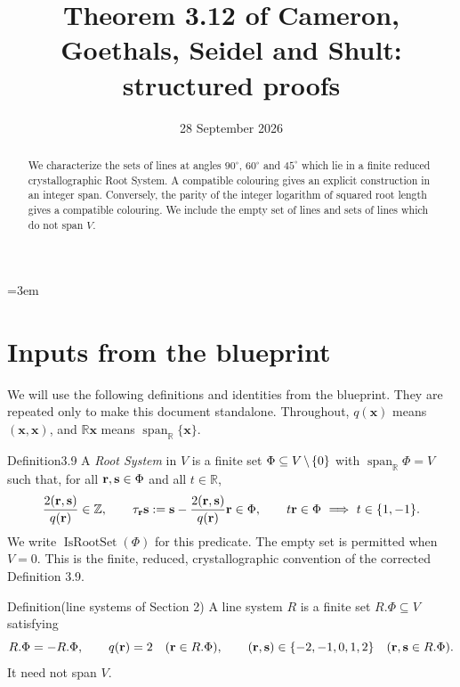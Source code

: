 \documentclass[11pt]{amsart}
\newcommand\ints{{\mathbb Z}}
\newcommand\re{{\mathbb R}}%
\newcommand\Zx{{\mathbf x}}
\newcommand\opk[1]{\mathop{\mathrm{#1}}\nolimits}
\newcommand\diff{\mathbin{\mkern-1.5mu\setminus\mkern-1.5mu}}%
\newcommand\sbs{\subseteq}
\begin{document}
\title[Theorem 3.12: structured proofs]{Theorem 3.12 of Cameron, Goethals, Seidel and Shult: structured proofs}
\date{28 September 2026}
\begin{abstract}
We characterize the sets of lines at angles $90^\circ$, $60^\circ$ and
$45^\circ$ which lie in a finite reduced crystallographic Root System.
A compatible colouring gives an explicit construction in an integer span.
Conversely, the parity of the integer logarithm of squared root length
gives a compatible colouring. We include the empty set of lines and
sets of lines which do not span $V$.
\end{abstract}
\maketitle
\raggedbottom
\emergencystretch=3em

\section*{Inputs from the blueprint}
We will use the following definitions and identities from the blueprint.
They are repeated only to make this document standalone. Throughout, $q(\Zx)$
means $(\Zx,\Zx)$, and $\re\Zx$ means
$\opk{span}_{\re}\{\Zx\}$.

\begin{cgss}{Definition}{3.9}\label{def:3.9}
\uses{}
A \emph{Root System} in $V$ is a finite set
$\Phi\sbs V\diff\{0\}$ with $\opk{span}_{\re}\Phi=V$
such that, for all ${\mathbf r},{\mathbf s}\in\Phi$ and all $t\in\re$,
\[
 \frac{2(\Zr,\Zs)}{q(\Zr)}\in\ints,\qquad
 \tau_{\Zr}\Zs:=\Zs-\frac{2(\Zr,\Zs)}{q(\Zr)}\Zr\in\Phi,
 \qquad t\Zr\in\Phi\ \Longrightarrow\ t\in\{1,-1\}.
\]
We write $\opk{IsRootSet}(\Phi)$ for this predicate.
The empty set is permitted when $V=0$. This is the finite, reduced,
crystallographic convention of the corrected Definition 3.9.
\end{cgss}

\begin{namedresult}{Definition}{(line systems of Section 2)}\label{def:line-system}
\uses{}
A line system $R$ is a finite set $R.\Phi\sbs V$ satisfying
\[
 R.\Phi=-R.\Phi,\qquad q({\mathbf r})=2\quad({\mathbf r}\in R.\Phi),\qquad
 ({\mathbf r},{\mathbf s})\in\{-2,-1,0,1,2\}\quad({\mathbf r},{\mathbf s}\in R.\Phi).
\]
It need not span $V$.
\end{namedresult}
\end{document}
